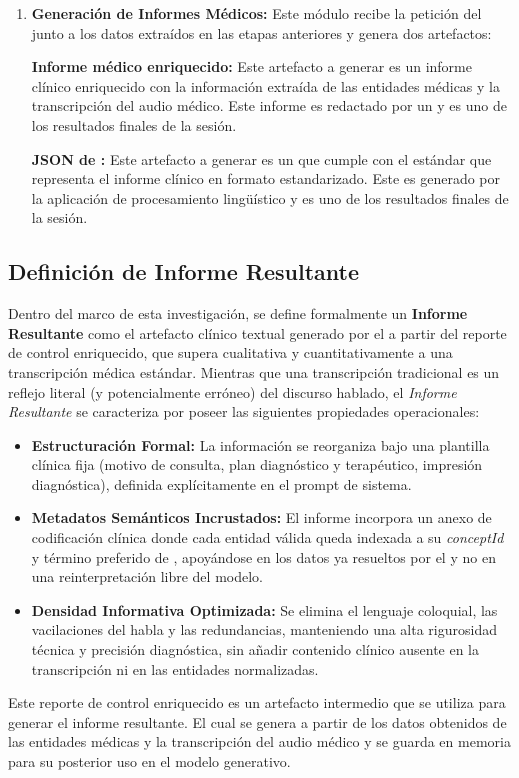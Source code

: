 \begin{enumerate}
    \item \textbf{Generación de Informes Médicos:} Este módulo recibe la petición del  junto a
    los datos extraídos en las etapas anteriores y genera dos artefactos:

    \textbf{Informe médico enriquecido:} Este artefacto a generar es un informe clínico enriquecido
    con la información extraída de las entidades médicas y la transcripción del audio médico.
    Este informe es redactado por un  y es uno de los resultados finales de la sesión.

    \textbf{JSON de :}
    Este artefacto a generar es un  que cumple con el estándar  que representa
    el informe clínico en formato estandarizado. Este  es generado por la aplicación
    de procesamiento lingüístico y es uno de los resultados finales de la sesión.
\end{enumerate}


\subsection{Definición de Informe Resultante}
Dentro del marco de esta investigación, se define formalmente un \textbf{Informe Resultante}
como el artefacto clínico textual generado por el  a partir del reporte de
control enriquecido, que supera cualitativa y cuantitativamente a una transcripción médica
estándar. Mientras que una transcripción tradicional es un reflejo literal (y potencialmente
erróneo) del discurso hablado, el \textit{Informe Resultante} se caracteriza por poseer las
siguientes propiedades operacionales:

\begin{itemize}
    \item \textbf{Estructuración Formal:} La información se reorganiza bajo una plantilla clínica
    fija (motivo de consulta, plan diagnóstico y terapéutico, impresión diagnóstica), definida
    explícitamente en el prompt de sistema.
    \item \textbf{Metadatos Semánticos Incrustados:} El informe incorpora un anexo de codificación
    clínica donde cada entidad válida queda indexada a su \textit{conceptId} y término preferido
    de , apoyándose en los datos ya resueltos por el 
    y no en una reinterpretación libre del modelo.
    \item \textbf{Densidad Informativa Optimizada:} Se elimina el lenguaje coloquial, las vacilaciones
    del habla y las redundancias, manteniendo una alta rigurosidad técnica y precisión diagnóstica,
    sin añadir contenido clínico ausente en la transcripción ni en las entidades normalizadas.
\end{itemize}

Este reporte de control enriquecido es un artefacto intermedio que se utiliza para generar el informe resultante.
El cual se genera a partir de los datos obtenidos de las entidades médicas y la transcripción del audio médico y se
guarda en memoria para su posterior uso en el modelo generativo.